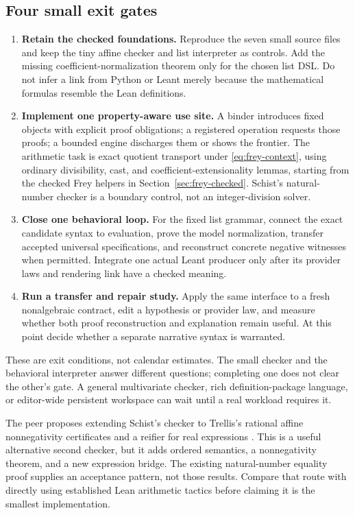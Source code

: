 \documentclass[11pt,letterpaper]{article}
\theoremstyle{definition}\newtheorem{definition}[proposition]{Definition}
\theoremstyle{remark}\newtheorem{remark}[proposition]{Remark}
\begin{document}
\subsection{Four small exit gates}
\begin{enumerate}
\item \textbf{Retain the checked foundations.} Reproduce the seven small source
files and keep the tiny affine checker and list interpreter as controls. Add
the missing coefficient-normalization theorem only for the chosen list DSL.
Do not infer a link from Python or Leant merely because the mathematical
formulas resemble the Lean definitions.
\item \textbf{Implement one property-aware use site.} A binder introduces fixed
objects with explicit proof obligations; a registered operation requests those
proofs; a bounded engine discharges them or shows the frontier. The arithmetic
task is exact quotient transport under \eqref{eq:frey-context}, using ordinary
divisibility, cast, and coefficient-extensionality lemmas, starting from the
checked Frey helpers in Section~\ref{sec:frey-checked}. Schist's natural-number
checker is a boundary control, not an integer-division solver.
\item \textbf{Close one behavioral loop.} For the fixed list grammar, connect
the exact candidate syntax to evaluation, prove the model normalization,
transfer accepted universal specifications, and reconstruct concrete negative
witnesses when permitted. Integrate one actual Leant producer only after its
provider laws and rendering link have a checked meaning.
\item \textbf{Run a transfer and repair study.} Apply the same interface to a
fresh nonalgebraic contract, edit a hypothesis or provider law, and measure
whether both proof reconstruction and explanation remain useful. At this point
decide whether a separate narrative syntax is warranted.
\end{enumerate}

These are exit conditions, not calendar estimates. The small checker and the
behavioral interpreter answer different questions; completing one does not
clear the other's gate. A general multivariate checker, rich definition-package
language, or editor-wide persistent workspace can wait until a real workload
requires it.

The peer proposes extending Schist's checker to Trellis's rational affine
nonnegativity certificates and a reifier for real expressions
\cite[Section 9.4]{round3-peer}. This is a useful alternative second checker,
but it adds ordered semantics, a nonnegativity theorem, and a new expression
bridge. The existing natural-number equality proof supplies an acceptance
pattern, not those results. Compare that route with directly using established
Lean arithmetic tactics before claiming it is the smallest implementation.
\end{document}
